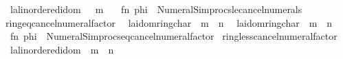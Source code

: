 \begin{isabellebody}
\ \ {\isacharbar}{\kern0pt}{\isachardoublequoteopen}{\isacharparenleft}{\kern0pt}l{\isacharcolon}{\kern0pt}{\isacharcolon}{\kern0pt}{\isacharprime}{\kern0pt}a{\isacharcolon}{\kern0pt}{\isacharcolon}{\kern0pt}linordered{\isacharunderscore}{\kern0pt}idom{\isacharparenright}{\kern0pt}\ {\isasymle}\ {\isacharminus}{\kern0pt}\ m{\isachardoublequoteclose}{\isacharparenright}{\kern0pt}\ {\isacharequal}{\kern0pt}\isanewline
\ \ {\isacartoucheopen}fn\ phi\ {\isacharequal}{\kern0pt}{\isachargreater}{\kern0pt}\ Numeral{\isacharunderscore}{\kern0pt}Simprocs{\isachardot}{\kern0pt}le{\isacharunderscore}{\kern0pt}cancel{\isacharunderscore}{\kern0pt}numerals{\isacartoucheclose}\isanewline
\isanewline
{}\isamarkupfalse%
\ ring{\isacharunderscore}{\kern0pt}eq{\isacharunderscore}{\kern0pt}cancel{\isacharunderscore}{\kern0pt}numeral{\isacharunderscore}{\kern0pt}factor\isanewline
\ \ {\isacharparenleft}{\kern0pt}{\isachardoublequoteopen}{\isacharparenleft}{\kern0pt}l{\isacharcolon}{\kern0pt}{\isacharcolon}{\kern0pt}{\isacharprime}{\kern0pt}a{\isacharcolon}{\kern0pt}{\isacharcolon}{\kern0pt}{\isacharbraceleft}{\kern0pt}idom{\isacharcomma}{\kern0pt}ring{\isacharunderscore}{\kern0pt}char{\isacharunderscore}{\kern0pt}{}{\isacharbraceright}{\kern0pt}{\isacharparenright}{\kern0pt}\ {\isacharasterisk}{\kern0pt}\ m\ {\isacharequal}{\kern0pt}\ n{\isachardoublequoteclose}\isanewline
\ \ {\isacharbar}{\kern0pt}{\isachardoublequoteopen}{\isacharparenleft}{\kern0pt}l{\isacharcolon}{\kern0pt}{\isacharcolon}{\kern0pt}{\isacharprime}{\kern0pt}a{\isacharcolon}{\kern0pt}{\isacharcolon}{\kern0pt}{\isacharbraceleft}{\kern0pt}idom{\isacharcomma}{\kern0pt}ring{\isacharunderscore}{\kern0pt}char{\isacharunderscore}{\kern0pt}{}{\isacharbraceright}{\kern0pt}{\isacharparenright}{\kern0pt}\ {\isacharequal}{\kern0pt}\ m\ {\isacharasterisk}{\kern0pt}\ n{\isachardoublequoteclose}{\isacharparenright}{\kern0pt}\ {\isacharequal}{\kern0pt}\isanewline
\ \ {\isacartoucheopen}fn\ phi\ {\isacharequal}{\kern0pt}{\isachargreater}{\kern0pt}\ Numeral{\isacharunderscore}{\kern0pt}Simprocs{\isachardot}{\kern0pt}eq{\isacharunderscore}{\kern0pt}cancel{\isacharunderscore}{\kern0pt}numeral{\isacharunderscore}{\kern0pt}factor{\isacartoucheclose}\isanewline
\isanewline
{}\isamarkupfalse%
\ ring{\isacharunderscore}{\kern0pt}less{\isacharunderscore}{\kern0pt}cancel{\isacharunderscore}{\kern0pt}numeral{\isacharunderscore}{\kern0pt}factor\isanewline
\ \ {\isacharparenleft}{\kern0pt}{\isachardoublequoteopen}{\isacharparenleft}{\kern0pt}l{\isacharcolon}{\kern0pt}{\isacharcolon}{\kern0pt}{\isacharprime}{\kern0pt}a{\isacharcolon}{\kern0pt}{\isacharcolon}{\kern0pt}linordered{\isacharunderscore}{\kern0pt}idom{\isacharparenright}{\kern0pt}\ {\isacharasterisk}{\kern0pt}\ m\ {\isacharless}{\kern0pt}\ n{\isachardoublequoteclose}\isanewline

\end{isabellebody}

